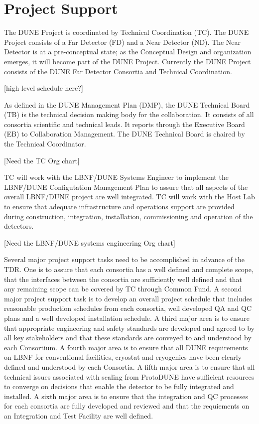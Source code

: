 \section{Project Support}
\label{sec:fdsp-coord-supp}

The DUNE Project is coordinated by Technical Coordination (TC). The
DUNE Project consists of a Far Detector (FD) and a Near Detector
(ND). The Near Detector is at a pre-conceptual state; as the
Conceptual Design and organization emerges, it will become part of the
DUNE Project. Currently the DUNE Project consists of the DUNE Far
Detector Consortia and Technical Coordination.

[high level schedule here?]

As defined in the DUNE Management Plan (DMP), the DUNE Technical Board (TB) is
the technical decision making body for the collaboration. It consists
of all consortia scientific and technical leads. It reports through
the Executive Board (EB) to Collaboration Management. The DUNE Technical
Board is chaired by the Technical Coordinator.

[Need the TC Org chart]


TC will work with the LBNF/DUNE Systems Engineer to implement the
LBNF/DUNE Configutation Management Plan to assure that all aspects of
the overall LBNF/DUNE project are well integrated. TC will work
with the Host Lab to ensure that adequate infrastructure and
operations support are provided during construction, integration,
installation, commissioning and operation of the detectors.

[Need the LBNF/DUNE systems engineering Org chart]

Several major project support tasks need to be accomplished in advance
of the TDR.  One is to assure that each consortia has a well defined
and complete scope, that the interfaces between the consortia are
sufficiently well defined and that any remaining scope can be covered
by TC through Common Fund. A second major project support task is to
develop an overall project schedule that includes reasonable
production schedules from each consortia, well developed QA and QC
plans and a well developed installation schedule. A third major area
is to ensure that appropriate engineering and safety standards are
developed and agreed to by all key stakeholders and that these
standards are conveyed to and understood by each Consortium. A fourth
major area is to ensure that all DUNE requirements on LBNF for
conventional facilities, cryostat and cryogenics have been clearly
defined and understood by each Consortia. A fifth major area is to
ensure that all technical issues associated with scaling from
ProtoDUNE have sufficient resources to converge on decisions that
enable the detector to be fully integrated and installed. A sixth
major area is to ensure that the integration and QC processes for each
consortia are fully developed and reviewed and that the requiements on
an Integration and Test Facility are well defined.

